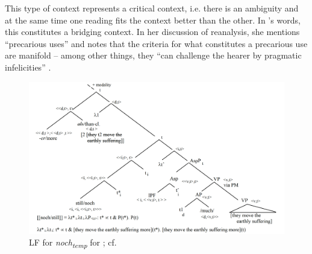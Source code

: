 \documentclass[output=paper]{langsci/langscibook}
\begin{document}
This type of context represents a critical context, i.e. there is an ambiguity and at the same time one reading fits the context better than the other. In \citeauthor{Eckardt_2011}'s \citeyearpar{Eckardt_2011} words, this constitutes a bridging context. In her discussion of reanalysis, she mentions ``precarious uses'' and notes that the criteria for what constitutes a precarious use are manifold -- among other things, they ``can challenge the hearer by pragmatic infelicities'' \citep[44]{Eckardt_2011}.

\begin{figure}
\includegraphics[width=1\textwidth]{figures/LF1_temp_>_over_noch}
\caption{LF for \textit{noch\textsubscript{temp}} for ; cf. \citep{beck2016a_sub}}
\label{fig:LF1_temp_>_over_noch}
\end{figure}
\end{document}
